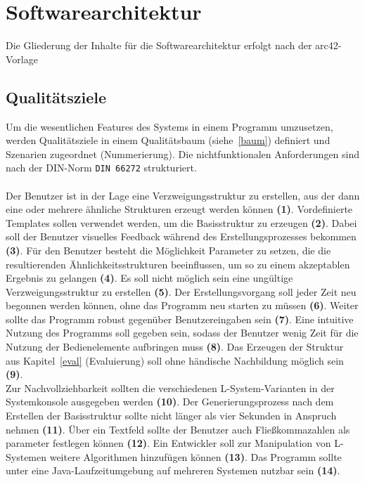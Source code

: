 \section{Softwarearchitektur}
Die Gliederung der Inhalte für die Softwarearchitektur erfolgt nach der arc42-Vorlage~\cite{arc42}

\subsection*{Qualitätsziele}
Um die wesentlichen Features des Systems in einem Programm umzusetzen, werden Qualitätsziele in einem Qualitätsbaum
(siehe~\ref{baum}) definiert und Szenarien zugeordnet (Nummerierung).
Die nichtfunktionalen Anforderungen sind nach der DIN-Norm \texttt{DIN 66272} strukturiert.\\~\\
Der Benutzer ist in der Lage eine Verzweigungsstruktur zu erstellen, aus der dann eine oder mehrere ähnliche Strukturen
erzeugt werden können \textbf{(1)}.
Vordefinierte Templates sollen verwendet werden, um die Basisstruktur zu erzeugen \textbf{(2)}.
Dabei soll der Benutzer visuelles Feedback während des Erstellungsprozesses bekommen \textbf{(3)}.
Für den Benutzer besteht die Möglichkeit Parameter zu setzen, die die resultierenden Ähnlichkeitsstrukturen beeinflussen,
um so zu einem akzeptablen Ergebnis zu gelangen \textbf{(4)}.
Es soll nicht möglich sein eine ungültige Verzweigungsstruktur zu erstellen \textbf{(5)}.
Der Erstellungsvorgang soll jeder Zeit neu begonnen werden können, ohne das Programm neu starten zu müssen \textbf{(6)}.
Weiter sollte das Programm robust gegenüber Benutzereingaben sein \textbf{(7)}.
Eine intuitive Nutzung des Programms soll gegeben sein, sodass der Benutzer wenig Zeit für die Nutzung der Bedienelemente
aufbringen muss \textbf{(8)}.
Das Erzeugen der Struktur aus Kapitel~\ref{eval} (Evaluierung) soll ohne händische Nachbildung möglich sein \textbf{(9)}.\\
Zur Nachvollziehbarkeit sollten die verschiedenen L-System-Varianten in der Systemkonsole ausgegeben werden \textbf{(10)}.
Der Generierungsprozess nach dem Erstellen der Basisstruktur sollte nicht länger als vier Sekunden in Anspruch nehmen \textbf{(11)}.
Über ein Textfeld sollte der Benutzer auch Fließkommazahlen als parameter festlegen können \textbf{(12)}.
Ein Entwickler soll zur Manipulation von L-Systemen weitere Algorithmen hinzufügen können \textbf{(13)}.
Das Programm sollte unter eine Java-Laufzeitumgebung auf mehreren Systemen nutzbar sein \textbf{(14)}.

